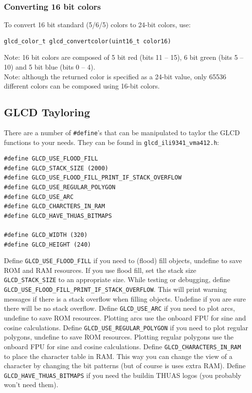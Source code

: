 \documentclass[12pt]{article}
\makeatletter
\newcommand{\ifunc}[1]{\index{#1@\texttt{#1}}}
\makeatother
\begin{document}
\subsubsection{Converting 16 bit colors}
\ifunc{glcd\_convertcolor}
\label{sec:convertcolors}
To convert 16 bit standard (5/6/5) colors to 24-bit colors, use:

\begin{lstlisting}
glcd_color_t glcd_convertcolor(uint16_t color16)
\end{lstlisting}

Note: 16 bit colors are composed of 5 bit red (bits 11 -- 15), 6 bit green (bits 5 -- 10) and 5 bit blue (bits 0 -- 4).\\
Note: although the returned color is specified as a 24-bit value, only 65536 different colors can be composed using 16-bit colors.

\subsection{GLCD Tayloring}
\label{sec:glcdtaylor}
There are a number of \lstinline|#define|'s that can be manipulated to taylor the GLCD functions to your needs. They can be found in \lstinline|glcd_ili9341_vma412.h|:

\begin{lstlisting}
#define GLCD_USE_FLOOD_FILL
#define GLCD_STACK_SIZE (2000)
#define GLCD_USE_FLOOD_FILL_PRINT_IF_STACK_OVERFLOW
#define GLCD_USE_REGULAR_POLYGON
#define GLCD_USE_ARC
#define GLCD_CHARCTERS_IN_RAM
#define GLCD_HAVE_THUAS_BITMAPS

#define GLCD_WIDTH (320)
#define GLCD_HEIGHT (240)
\end{lstlisting}

Define \lstinline|GLCD_USE_FLOOD_FILL| if you need to (flood) fill objects, undefine to save ROM  and RAM resources. If you use flood fill, set the stack size \lstinline|GLCD_STACK_SIZE| to an appropriate size. While testing or debugging, define \lstinline|GLCD_USE_FLOOD_FILL_PRINT_IF_STACK_OVERFLOW|. This will print warning messages if there is a stack overflow when filling objects. Undefine if you are sure there will be no stack overflow. Define \lstinline|GLCD_USE_ARC| if you need to plot arcs, undefine to save ROM resources. Plotting arcs use the onboard FPU for sine and cosine calculations. Define \lstinline|GLCD_USE_REGULAR_POLYGON| if you need to plot regular polygons, undefine to save ROM resources. Plotting regular polygons use the onboard FPU for sine and cosine calculations. Define \lstinline|GLCD_CHARACTERS_IN_RAM| to place the character table in RAM. This way you can change the view of a character by changing the bit patterns (but of course is uses extra RAM). Define \lstinline|GLCD_HAVE_THUAS_BITMAPS| if you need the buildin THUAS logos (you probably won't need them).
\end{document}
